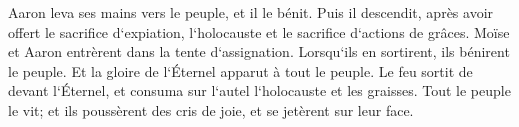 \verse Aaron leva ses mains vers le peuple, et il le bénit. Puis il descendit, après avoir offert le sacrifice d`expiation, l`holocauste et le sacrifice d`actions de grâces. 
\verse Moïse et Aaron entrèrent dans la tente d`assignation. Lorsqu`ils en sortirent, ils bénirent le peuple. Et la gloire de l`Éternel apparut à tout le peuple. 
\verse Le feu sortit de devant l`Éternel, et consuma sur l`autel l`holocauste et les graisses. Tout le peuple le vit; et ils poussèrent des cris de joie, et se jetèrent sur leur face. 

\chapter{}

